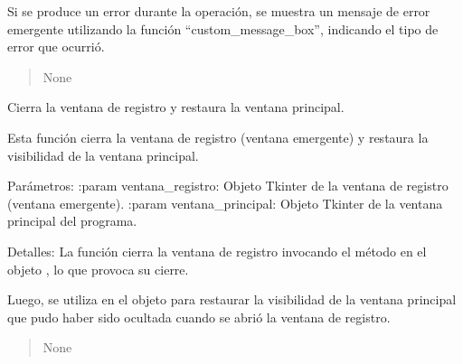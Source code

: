 \documentclass[letterpaper,10pt,spanish]{sphinxmanual}
\begin{document}
\begin{fulllineitems}
\begin{fulllineitems}
\sphinxAtStartPar
Si se produce un error durante la operación, se muestra un mensaje de error emergente utilizando la función
“custom\_message\_box”, indicando el tipo de error que ocurrió.
\begin{quote}\begin{description}
\sphinxAtStartPar
None

\end{description}\end{quote}

\end{fulllineitems}


\begin{fulllineitems}
\label{\detokenize{datos:datos.GestionDatos.cerrar_ventana_registro}}
\pysigstartsignatures
{}
\pysigstopsignatures
\sphinxAtStartPar
Cierra la ventana de registro y restaura la ventana principal.

\sphinxAtStartPar
Esta función cierra la ventana de registro (ventana emergente) y restaura
la visibilidad de la ventana principal.

\sphinxAtStartPar
Parámetros:
:param ventana\_registro: Objeto Tkinter de la ventana de registro (ventana emergente).
:param ventana\_principal: Objeto Tkinter de la ventana principal del programa.

\sphinxAtStartPar
Detalles:
La función cierra la ventana de registro invocando el método  en
el objeto , lo que provoca su cierre.

\sphinxAtStartPar
Luego, se utiliza  en el objeto  para restaurar
la visibilidad de la ventana principal que pudo haber sido ocultada cuando se
abrió la ventana de registro.
\begin{quote}\begin{description}
\sphinxAtStartPar
None

\end{description}\end{quote}


\end{fulllineitems}
\end{fulllineitems}
\end{document}
